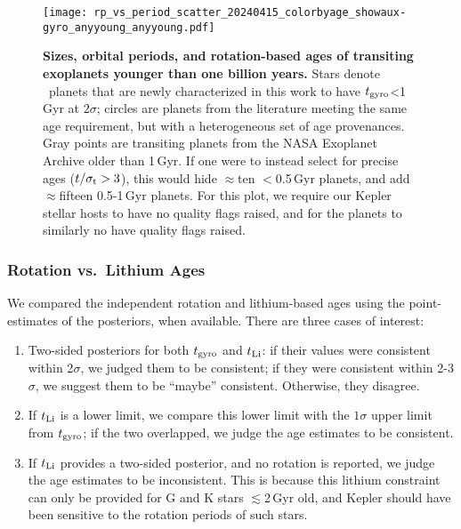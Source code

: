 \documentclass[11pt,twocolumn,tighten]{aastex63}
\begin{document}
\begin{figure*}[!t]
  \begin{center}
    \texttt{[image: rp\_vs\_period\_scatter\_20240415\_colorbyage\_showaux-gyro\_anyyoung\_anyyoung.pdf]}
  \end{center}
  \vspace{-0.5cm}
  \caption{
    {\bf Sizes, orbital periods, and rotation-based ages of transiting
    exoplanets younger than one billion years.} Stars denote
    \nplyounggyrotwosigmanograzingnoruwe\ planets that are newly
    characterized in this work to have $t_{\rm gyro}$<1\,Gyr at
    $2$$\sigma$; circles are planets from the literature meeting the
    same age requirement, but with a heterogeneous set of age
    provenances.  Gray points are transiting planets from the NASA
    Exoplanet Archive older than 1\,Gyr.  If one were to instead select for
    precise ages ($t/\sigma_{\rm t}>3$), this would hide $\approx$ten
    $<$0.5\,Gyr planets, and add $\approx$fifteen 0.5-1\,Gyr planets.
    For this plot, we require our Kepler stellar hosts to have no
    quality flags raised, and for the planets to
    similarly no have quality flags raised. 
    \label{fig:rp_period_age_results}
  }
\end{figure*}

\subsubsection{Rotation vs.~Lithium Ages}

We compared the independent rotation and
lithium-based ages using the point-estimates of the posteriors,
when available.  There are three cases of interest:

\begin{enumerate}[leftmargin=*,topsep=0pt,itemsep=-1ex,partopsep=1ex,parsep=1ex]
  \item Two-sided posteriors for both $t_{\rm gyro}$ and
    $t_{\rm Li}$: if their values were consistent within 2$\sigma$, we
    judged them to be consistent; if they were consistent within
    2-3$\sigma$, we suggest them to be ``maybe'' consistent.
    Otherwise, they disagree.
  \item If $t_{\rm Li}$ is a lower limit, we compare this
    lower limit with the $1\sigma$ upper limit from $t_{\rm gyro}$; if
    the two overlapped, we judge the age estimates to be consistent.
  \item If $t_{\rm Li}$ provides a two-sided posterior, and no
    rotation is reported, we judge the age estimates to be
    inconsistent.  This is because this lithium constraint can only be
    provided for G and K stars $\lesssim$2\,Gyr old, and Kepler should
    have been sensitive to the rotation periods of such stars.
\end{enumerate}
\end{document}
